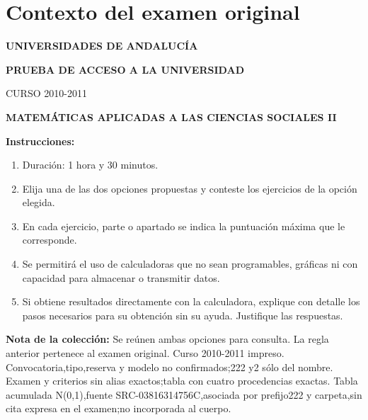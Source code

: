 \section*{Contexto del examen original}
\textbf{UNIVERSIDADES DE ANDALUCÍA}\par
\textbf{PRUEBA DE ACCESO A LA UNIVERSIDAD}\par
CURSO 2010-2011\par
\textbf{MATEMÁTICAS APLICADAS A LAS CIENCIAS SOCIALES II}

\textbf{Instrucciones:}
\begin{enumerate}[label=\textbf{\alph*)}]
  \item Duración: 1 hora y 30 minutos.
  \item Elija una de las dos opciones propuestas y conteste los ejercicios de la opción elegida.
  \item En cada ejercicio, parte o apartado se indica la puntuación máxima que le corresponde.
  \item Se permitirá el uso de calculadoras que no sean programables, gráficas ni con capacidad para almacenar o transmitir datos.
  \item Si obtiene resultados directamente con la calculadora, explique con detalle los pasos necesarios para su obtención sin su ayuda. Justifique las respuestas.
\end{enumerate}
\noindent\textbf{Nota de la colección:} Se reúnen ambas opciones para consulta. La regla anterior pertenece al examen original. Curso 2010-2011 impreso. Convocatoria,tipo,reserva y modelo no confirmados;222 y2 sólo del nombre. Examen y criterios sin alias exactos;tabla con cuatro procedencias exactas. Tabla acumulada N(0,1),fuente SRC-03816314756C,asociada por prefijo222 y carpeta,sin cita expresa en el examen;no incorporada al cuerpo.
\par\medskip
